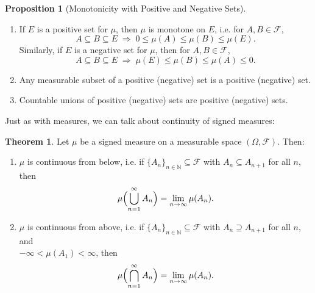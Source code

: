 \documentclass[11pt,a4paper]{article}
\theoremstyle{definition}
\newtheorem{theorem}{Theorem}[section]
\newtheorem{proposition}{Proposition}[section]
\begin{document}
\begin{proposition}[Monotonicity with Positive and Negative Sets] $ $
\begin{enumerate}
\item If $E$ is a positive set for $\mu$, then $\mu$ is monotone on $E$, i.e. for $A,B\in\mathcal{F}$, 
\[
A\subseteq B\subseteq E \;\Longrightarrow\; 0 \le \mu(A) \le \mu(B) \le \mu(E).
\]
Similarly, if $E$ is a negative set for $\mu$, then for $A,B\in\mathcal{F}$,
\[
A\subseteq B\subseteq E \;\Longrightarrow\; \mu(E) \le \mu(B) \le \mu(A) \le 0.
\]
\item Any measurable subset of a positive (negative) set is a positive (negative) set.
\item Countable unions of positive (negative) sets are positive (negative) sets.
\end{enumerate}
\end{proposition} \noindent
Just as with measures, we can talk about continuity of signed measures:
\begin{theorem}
Let $\mu$ be a signed measure on a measurable space $(\Omega,\mathcal{F})$.  Then:
\begin{enumerate}
\item $\mu$ is continuous from below, i.e. if $\{A_n\}_{n\in\mathbb{N}}\subseteq\mathcal{F}$ with $A_n\subseteq A_{n+1}$ for all $n$, then
\[
\mu\Bigl(\bigcup_{n=1}^\infty A_n\Bigr)
=\lim_{n\to\infty} \mu(A_n).
\]
\item $\mu$ is continuous from above, i.e. if $\{A_n\}_{n\in\mathbb{N}}\subseteq\mathcal{F}$ with $A_n\supseteq A_{n+1}$ for all $n$, and \\ $-\infty<\mu(A_1)<\infty$, then
\[
\mu\Bigl(\bigcap_{n=1}^\infty A_n\Bigr)
=\lim_{n\to\infty} \mu(A_n).
\]
\end{enumerate}
\end{theorem}
\end{document}
